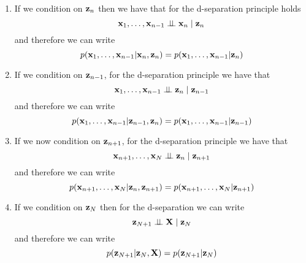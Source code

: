 \documentclass{amsmlaj}
\begin{document}
\begin{sol}
	\begin{enumerate}
		\item If we condition on $\bm{\mathbf{z}}_n$ then we have that for the d-separation
			principle holds
			\begin{equation}
				\bm{\mathbf{x}}_1,\dots,\bm{\mathbf{x}}_{n-1} \perp\!\!\!\perp \bm{\mathbf{x}}_n \mid \bm{\mathbf{z}}_n
			\end{equation}
			and therefore we can write
			\begin{equation}
				p(\bm{\mathbf{x}}_1,\dots,\bm{\mathbf{x}}_{n-1}|\bm{\mathbf{x}}_n,\bm{\mathbf{z}}_n)=p(\bm{\mathbf{x}}_1,\dots,\bm{\mathbf{x}}_{n-1}|\bm{\mathbf{z}}_n)
			\end{equation}
		\item If we condition on $\bm{\mathbf{z}}_{n-1}$, for the d-separation principle we have that
			\begin{equation}
				\bm{\mathbf{x}}_1,\dots,\bm{\mathbf{x}}_{n-1} \perp\!\!\!\perp \bm{\mathbf{z}}_n \mid \bm{\mathbf{z}}_{n-1}
			\end{equation}
			and therefore we can write
			\begin{equation}
				p(\bm{\mathbf{x}}_1,\dots,\bm{\mathbf{x}}_{n-1}|\bm{\mathbf{z}}_{n-1},\bm{\mathbf{z}}_n)=p(\bm{\mathbf{x}}_1,\dots,\bm{\mathbf{x}}_{n-1}|\bm{\mathbf{z}}_{n-1})
			\end{equation}
		\item If we now condition on $\bm{\mathbf{z}}_{n+1}$, for the d-separation principle we have that
			\begin{equation}
				\bm{\mathbf{x}}_{n+1},\dots,\bm{\mathbf{x}}_N \perp\!\!\!\perp \bm{\mathbf{z}}_n \mid \bm{\mathbf{z}}_{n+1}
			\end{equation}
			and therefore we can write
			\begin{equation}
				p(\bm{\mathbf{x}}_{n+1},\dots,\bm{\mathbf{x}}_N|\bm{\mathbf{z}}_n,\bm{\mathbf{z}}_{n+1})=p(\bm{\mathbf{x}}_{n+1},\dots,\bm{\mathbf{x}}_N|\bm{\mathbf{z}}_{n+1})
			\end{equation}
		\item If we condition on $\bm{\mathbf{z}}_N$ then for the d-separation we can write
			\begin{equation}
				\bm{\mathbf{z}}_{N+1} \perp\!\!\!\perp \bm{\mathbf{X}} \mid \bm{\mathbf{z}}_N
			\end{equation}
			and therefore we can write
			\begin{equation}
				p(\bm{\mathbf{z}}_{N+1}|\bm{\mathbf{z}}_N,\bm{\mathbf{X}})=p(\bm{\mathbf{z}}_{N+1}|\bm{\mathbf{z}}_N)
			\end{equation}
	\end{enumerate}
\end{sol}
\end{document}
